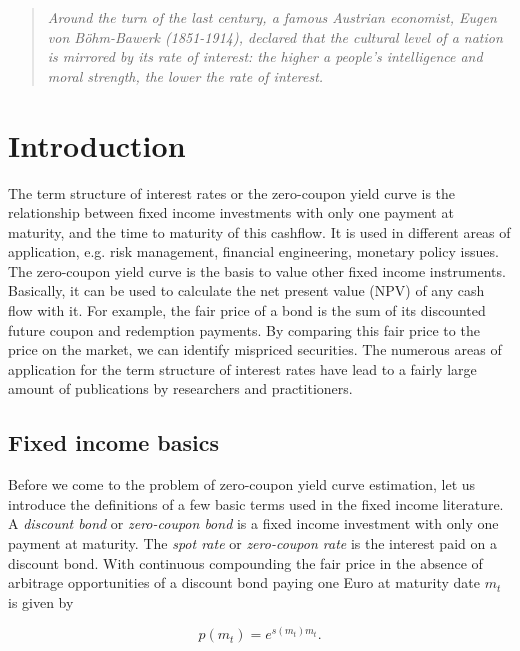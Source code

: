 \begin{quote}
\emph{
  Around the turn of the last century, a famous Austrian economist, Eugen von B\"{o}hm-Bawerk (1851-1914), declared that the cultural level of a nation is  mirrored by its rate of interest: the higher a people's intelligence and moral strength, the lower the rate of interest.}
\\
\end{quote}

\section{Introduction}

The term structure of interest rates or the zero-coupon yield curve is the relationship between fixed income investments with only one payment at maturity, and the time to maturity of this cashflow. It is used in different areas of application, e.g. risk management, financial engineering, monetary policy issues. The zero-coupon yield curve is the basis to value other fixed income instruments. Basically, it can be used to calculate the net present value (NPV) of any cash flow with it. For example, the fair price of a bond is the sum of its discounted future coupon and redemption payments. By comparing this fair price to the price on the market, we can identify mispriced securities. The numerous areas of application for the term structure of interest rates have lead to a fairly large amount of publications by researchers and practitioners.

\subsection{Fixed income basics}

Before we come to the problem of zero-coupon yield curve estimation, let us introduce the definitions of a few basic terms used in the fixed income literature. A \emph{discount bond} or \emph{zero-coupon bond} is a fixed income investment with only one payment at maturity. The \emph{spot rate} or \emph{zero-coupon rate} is the interest paid on a discount bond. With continuous compounding the fair price in the absence of arbitrage opportunities of a discount bond paying one Euro at maturity date  $m_t$ is given by

\begin{equation}
  \label{eq:pricediscountbond}
  p(m_t)=e^{s(m_t)m_t}.
\end{equation}

